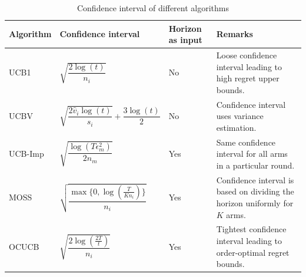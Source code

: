 \begin{table}[!ht]
\caption{Confidence interval of different algorithms}
\label{tab:conf-comp}
\begin{center}
\begin{tabular}{|p{5em}|p{10em}|p{4em}|p{12em}|}
\hline
Algorithm  &  Confidence interval & Horizon as input & Remarks \\
\hline
\hline
UCB1        & $\sqrt{\dfrac{2\log (t)}{n_i}}$ & No & Loose confidence interval leading to high regret upper bounds.\\%
\hline
\hline
UCBV        & $\sqrt{\dfrac{2\hat{v}_i\log (t)}{s_i}} + \dfrac{3\log (t)}{2}$ & No & Confidence interval uses variance estimation.\\
\hline
\hline
UCB-Imp 		& $\sqrt{\dfrac{\log{( T\epsilon_{m}^{2})}}{2 n_{m}}}$ & Yes & Same confidence interval for all arms in a particular round.\\%
\hline
\hline
MOSS	     	& $\sqrt{\dfrac{\max\lbrace 0,\log(\frac{T}{K n_i})\rbrace}{n_i}}$ & Yes & Confidence interval is based on dividing the horizon uniformly for $K$ arms.\\%
\hline
\hline
OCUCB     	& $\sqrt{\dfrac{2\log(\frac{2T}{t})}{n_i}}$ & Yes & Tightest confidence interval leading to order-optimal regret bounds.\\\midrule
\end{tabular}
\end{center}
\end{table} 